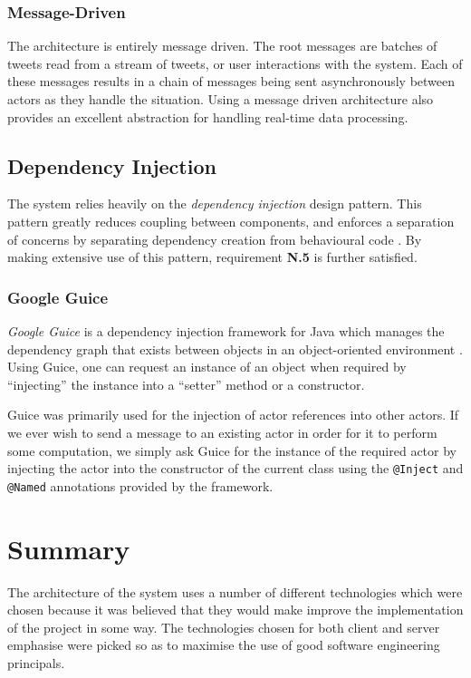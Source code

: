 \documentclass{l4proj}
\newcommand{\code}[1]{\texttt{#1}}
\begin{document}
            \subsubsection{Message-Driven}
            The architecture is entirely message driven. The root messages are batches of tweets read from a stream of tweets, or user interactions with the system. Each of these messages results in a chain of messages being sent asynchronously between actors as they handle the situation. Using a message driven architecture also provides an excellent abstraction for handling real-time data processing.      
        
        \subsection{Dependency Injection}
        
        The system relies heavily on the \textit{dependency injection} design pattern. This pattern greatly reduces coupling between components, and enforces a separation of concerns by separating dependency creation from behavioural code \cite{di}. By making extensive use of this pattern, requirement \textbf{N.5} is further satisfied.
        
            \subsubsection{Google Guice}
                
        \textit{Google Guice} is a dependency injection framework for Java which manages the dependency graph that exists between objects in an object-oriented environment \cite{guice}. Using Guice, one can request an instance of an object when required by ``injecting'' the instance into a ``setter'' method or a constructor.

Guice was primarily used for the injection of actor references into other actors. If we ever wish to send a message to an existing actor in order for it to perform some computation, we simply ask Guice for the instance of the required actor by injecting the actor into the constructor of the current class using the \code{@Inject} and \code{@Named} annotations provided by the framework.

    \section{Summary}
    The architecture of the system uses a number of different technologies which were chosen because it was believed that they would make improve the implementation of the project in some way. The technologies chosen for both client and server emphasise were picked so as to maximise the use of good software engineering principals.
        
\end{document}
